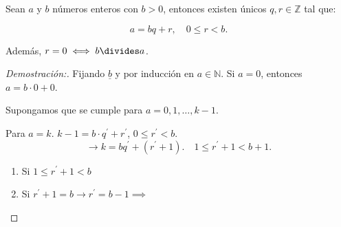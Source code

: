 \documentclass[oneside,a5paper]{memoir}
\begin{document}
\begin{theorem}

Sean $a$ y $b$ números enteros con $b>0$, entonces existen únicos $q,r\in\mathbb{Z}$ tal que:

\[a=bq+r,\quad0\leq r<b.\]

\noindent
Además, $r=0\iff b\divides a$.

\begin{proof}[Demostración:]
Fijando $\underline{b}$ y por inducción en $a\in\mathbb{N}$. Si $a=0$, entonces $a=b\cdot0+0$. \checkmark

\noindent
Supongamos que se cumple para $a=0,1,\ldots,k-1$.

\noindent
Para $a=k$. $k-1=b\cdot q^{\prime}+r^{\prime}$, $0\leq r^{\prime}<b$.
\[\longrightarrow k=bq^{\prime}+(r^{\prime}+1).\quad1\leq r^{\prime}+1<b+1.\]

\begin{enumerate}[font={\bfseries},label={$\bullet$)}]

\item Si $1\leq r^{\prime}+1<b$ \checkmark

\item Si $r^{\prime}+1=b\rightarrow r^{\prime}=b-1\implies$

\end{enumerate}
\end{proof}

\end{theorem}



\end{document}
